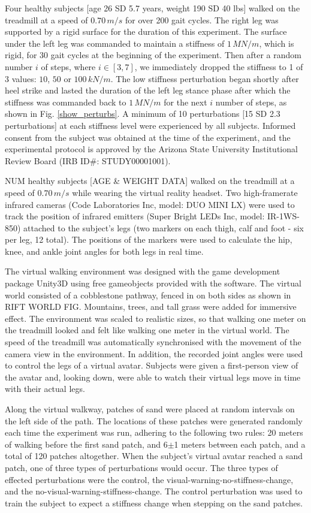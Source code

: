 Four healthy subjects [age 26 SD 5.7 years, weight 190 SD 40 lbs] walked on the treadmill at a speed of $0.70\,m/s$ for over 200 gait cycles.  The right leg was supported by a rigid surface for the duration of this experiment.  The surface under the left leg was commanded to maintain a stiffness of $1\,MN/m$, which is rigid, for 30 gait cycles at the beginning of the experiment.  Then after a random number $i$ of steps, where $i \in \left[ {3,7} \right]$, we immediately dropped the stiffness to 1 of 3 values: $10$, $50$ or $100\,kN/m$.  The low stiffness perturbation began shortly after heel strike and lasted the duration of the left leg stance phase after which the stiffness was commanded back to $1\,MN/m$ for the next $i$ number of steps, as shown in Fig. \ref{show_perturbs}. A minimum of 10 perturbations [15 SD 2.3 perturbations] at each stiffness level were experienced by all subjects.  Informed consent from the subject was obtained at the time of the experiment, and the experimental protocol is approved by the Arizona State University Institutional Review Board (IRB ID\#: STUDY00001001).


NUM healthy subjects [AGE \& WEIGHT DATA] walked on the treadmill at a speed of $0.70\,m/s$ while wearing the virtual reality headset. Two high-framerate infrared cameras (Code Laboratories Inc, model: DUO MINI LX) were used to track the position of infrared emitters (Super Bright LEDs Inc, model: IR-1WS-850) attached to the subject's legs (two markers on each thigh, calf and foot - six per leg, 12 total). The positions of the markers were used to calculate the hip, knee, and ankle joint angles for both legs in real time.

The virtual walking environment was designed with the game development package Unity3D using free gameobjects provided with the software. The virtual world consisted of a cobblestone pathway, fenced in on both sides as shown in RIFT WORLD FIG. Mountains, trees, and tall grass were added for immersive effect. The environment was scaled to realistic sizes, so that walking one meter on the treadmill looked and felt like walking one meter in the virtual world. The speed of the treadmill was automatically synchronised with the movement of the camera view in the environment. In addition, the recorded joint angles were used to control the legs of a virtual avatar. Subjects were given a first-person view of the avatar and, looking down, were able to watch their virtual legs move in time with their actual legs. 

Along the virtual walkway, patches of sand were placed at random intervals on the left side of the path. The locations of these patches were generated randomly each time the experiment was run, adhering to the following two rules: 20 meters of walking before the first sand patch, and 6$\pm$1 meters between each patch, and a total of 120 patches altogether. When the subject's virtual avatar reached a sand patch, one of three types of perturbations would occur. The three types of effected perturbations were the control, the visual-warning-no-stiffness-change, and the no-visual-warning-stiffness-change. The control perturbation was used to train the subject to expect a stiffness change when stepping on the sand patches.

